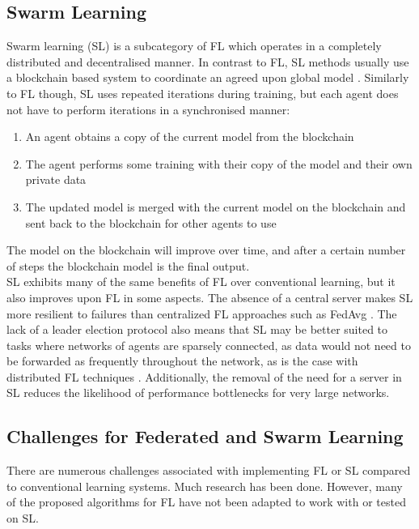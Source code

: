 \subsection{Swarm Learning}
Swarm learning (SL) \cite{swarm_learning} is a subcategory of FL which operates in a completely distributed and decentralised manner. In contrast to FL, SL methods usually use a blockchain based system to coordinate an agreed upon global model \citeme. Similarly to FL though, SL uses repeated iterations during training, but each agent does not have to perform iterations in a synchronised manner:
\begin{enumerate}
	\item An agent obtains a copy of the current model from the blockchain
	\item The agent performs some training with their copy of the model and their own private data
	\item The updated model is merged with the current model on the blockchain and sent back to the blockchain for other agents to use
\end{enumerate}
The model on the blockchain will improve over time, and after a certain number of steps the blockchain model is the final output. \\

SL exhibits many of the same benefits of FL over conventional learning, but it also improves upon FL in some aspects. The absence of a central server makes SL more resilient to failures than centralized FL approaches such as FedAvg \citeme. The lack of a leader election protocol also means that SL may be better suited to tasks where networks of agents are sparsely connected, as data would not need to be forwarded as frequently throughout the network, as is the case with distributed FL techniques \citeme. Additionally, the removal of the need for a server in SL reduces the likelihood of performance bottlenecks for very large networks.

\subsection{Challenges for Federated and Swarm Learning}
There are numerous challenges associated with implementing FL or SL compared to conventional learning systems. Much research has been done. However, many of the proposed algorithms for FL have not been adapted to work with or tested on SL.

